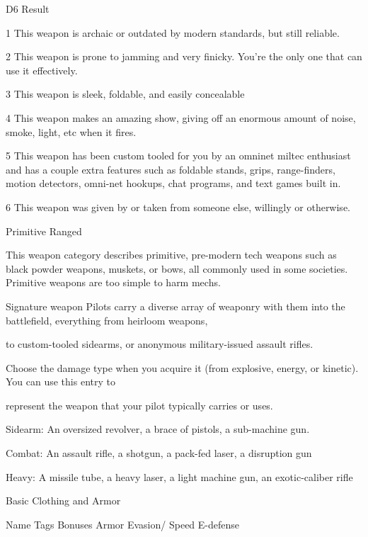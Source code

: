                                                                                                                           


 D6      Result 

 1       This weapon is archaic or outdated by modern standards, but still reliable. 

 2       This weapon is prone to jamming and very finicky. You’re the only one that can use it effectively. 

 3       This weapon is sleek, foldable, and easily concealable 

 4       This weapon makes an amazing show, giving off an enormous amount of noise, smoke, light, etc when it  
         fires. 

 5       This weapon has been custom tooled for you by an omninet miltec enthusiast and has a couple extra  
         features such as foldable stands, grips, range-finders, motion detectors, omni-net hookups, chat programs,  
         and text games built in. 

 6       This weapon was given by or taken from someone else, willingly or otherwise. 

Primitive Ranged  

This weapon category describes primitive, pre-modern tech weapons such as black powder weapons,  
muskets, or bows, all commonly used in some societies. Primitive weapons are too simple to harm mechs.
 

Signature weapon  
Pilots carry a diverse array of weaponry with them into the battlefield, everything from heirloom weapons,  

to custom-tooled sidearms, or anonymous military-issued assault rifles. 
 

Choose the damage type when you acquire it (from explosive, energy, or kinetic). You can use this entry to  

represent the weapon that your pilot typically carries or uses. 
 

Sidearm: An oversized revolver, a brace of pistols, a sub-machine gun.
 

Combat: An assault rifle, a shotgun, a pack-fed laser, a disruption gun
 
Heavy: A missile tube, a heavy laser, a light machine gun, an exotic-caliber rifle
 

                                             Basic Clothing and Armor
 

    Name                Tags                Bonuses                              Armor        Evasion/         Speed 
                                                                                              E-defense 


